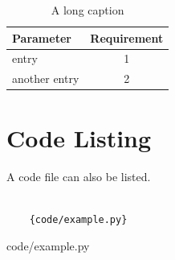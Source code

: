 \documentclass[11pt,a4paper]{article}
\begin{document}
    \begin{table}[h]
        \centering
        \begin{tabular}{l c}
            \hline
            Parameter & Requirement \\
            \hline
            entry & 1\\
            \hline
            another entry & 2\\
            \hline
        \end{tabular}
        \caption[A short caption]{A long caption}
        \label{tab:a_tab}
    \end{table}
    
\appendix
\section{Code Listing}
    \label{app: code}
    A code file can also be listed.
    \begin{lstlisting}[language=tex]
    
    {code/example.py}
    \end{lstlisting}
    
    {code/example.py}
\end{document}
